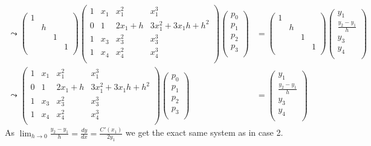 \documentclass[english,11pt,a4paper]{article}
\begin{document}
\begin{align*}
  \leadsto
  \begin{pmatrix}
  1\\ 
  & h\\
  & & 1\\
  & & & 1\\
  \end{pmatrix}
  \begin{pmatrix}
  1 & x_1 & x_1^2 & x_1^3\\
  0 & 1 & 2x_1 + h & 3x_1^2+3x_1h+h^2\\
  1 & x_3 & x_3^2 & x_3^3\\
  1 & x_4 & x_4^2 & x_4^3\\
  \end{pmatrix}
  \begin{pmatrix}
  p_0 \\
  p_1 \\
  p_2 \\
  p_3 \\
  \end{pmatrix}
  &=
  \begin{pmatrix}
  1\\ 
  & h\\
  & & 1\\
  & & & 1\\
  \end{pmatrix}
  \begin{pmatrix}
  y_1 \\
  \frac{y_2-y_1}{h} \\
  y_3 \\
  y_4 \\
  \end{pmatrix}
  \\
  \leadsto
  \begin{pmatrix}
  1 & x_1 & x_1^2 & x_1^3\\
  0 & 1 & 2x_1 + h & 3x_1^2+3x_1h+h^2\\
  1 & x_3 & x_3^2 & x_3^3\\
  1 & x_4 & x_4^2 & x_4^3\\
  \end{pmatrix}
  \begin{pmatrix}
  p_0 \\
  p_1 \\
  p_2 \\
  p_3 \\
  \end{pmatrix}
  &=
  \begin{pmatrix}
  y_1 \\
  \frac{y_2-y_1}{h} \\
  y_3 \\
  y_4 \\
  \end{pmatrix}
\end{align*}
As $\lim_{h \to 0} \frac{y_2-y_1}{h} = \frac{dy}{dx} = \frac{C'(x_1)}{2y_1}$ we get the exact same system as in case 2.
\end{document}
